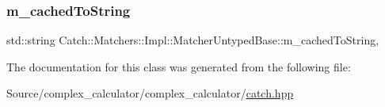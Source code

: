 \subsubsection{\texorpdfstring{m\+\_\+cached\+To\+String}{m\_cachedToString}}
{\footnotesize\ttfamily std\+::string Catch\+::\+Matchers\+::\+Impl\+::\+Matcher\+Untyped\+Base\+::m\+\_\+cached\+To\+String\hspace{0.3cm}{\ttfamily [mutable]}, {\ttfamily [protected]}}



The documentation for this class was generated from the following file\+:\begin{DoxyCompactItemize}
\item 
Source/complex\+\_\+calculator/complex\+\_\+calculator/\mbox{\hyperlink{catch_8hpp}{catch.\+hpp}}\end{DoxyCompactItemize}
